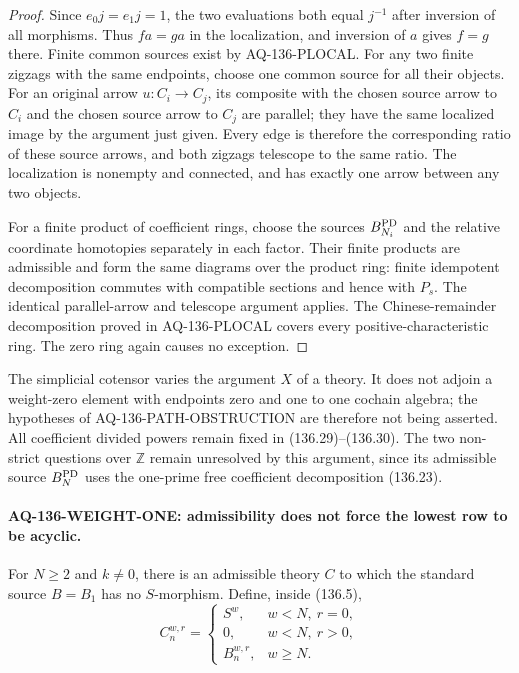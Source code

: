 \begin{proof}
Since $e_0j=e_1j=1$, the two evaluations both equal
$j^{-1}$ after inversion of all morphisms.  Thus
$fa=ga$ in the localization, and inversion of $a$
gives $f=g$ there.
Finite common sources exist by AQ-136-PLOCAL.
For any two finite zigzags with the same endpoints,
choose one common source for all their objects.  For
an original arrow $u:C_i\to C_j$, its composite with
the chosen source arrow to $C_i$ and the chosen source
arrow to $C_j$ are parallel; they have the same localized
image by the argument just given.  Every edge is
therefore the corresponding ratio of these source
arrows, and both zigzags telescope to the same ratio.
The localization is nonempty and connected, and has
exactly one arrow between any two objects.

For a finite product of coefficient rings, choose the
sources $B_{N_i}^{\rm PD}$ and the relative coordinate
homotopies separately in each factor.  Their finite
products are admissible and form the same diagrams over
the product ring: finite idempotent decomposition
commutes with compatible sections and hence with
$P_s$.  The identical parallel-arrow and telescope
argument applies.  The Chinese-remainder decomposition
proved in AQ-136-PLOCAL covers every positive-characteristic
ring.  The zero ring again causes no exception.
\end{proof}

The simplicial cotensor varies the argument $X$ of a
theory.  It does not adjoin a weight-zero element with
endpoints zero and one to one cochain algebra; the
hypotheses of AQ-136-PATH-OBSTRUCTION are therefore
not being asserted.  All coefficient divided powers
remain fixed in (136.29)--(136.30).
The two non-strict questions over $\mathbb Z$ remain
unresolved by this argument, since its admissible
source $B_N^{\rm PD}$ uses the one-prime free coefficient
decomposition (136.23).

\paragraph{AQ-136-WEIGHT-ONE: admissibility does not force the lowest row to be acyclic.}
For $N\geq2$ and $k\ne0$, there is an admissible theory
$C$ to which the standard source $B=B_1$ has no
$S$-morphism.  Define, inside (136.5),
\[
 C^{w,r}_n=
 \begin{cases}
 S^w,&w<N,\ r=0,\\
 0,&w<N,\ r>0,\\
 B^{w,r}_n,&w\geq N.
 \end{cases}                                               \tag{136.31}
\]

